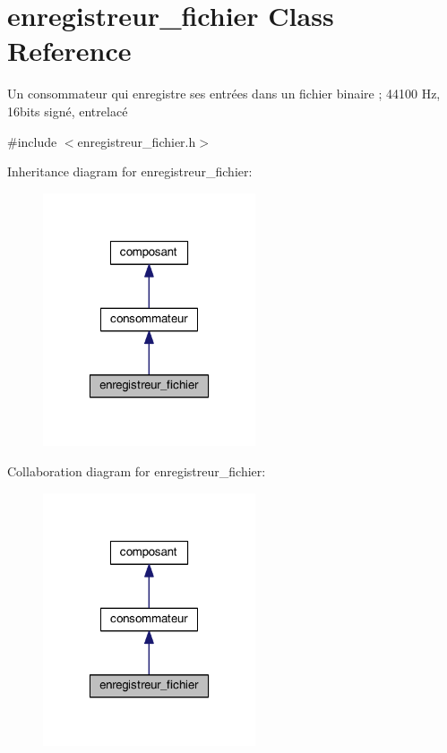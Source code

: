 \hypertarget{classenregistreur__fichier}{\section{enregistreur\-\_\-fichier Class Reference}
\label{classenregistreur__fichier}
}


Un consommateur qui enregistre ses entrées dans un fichier binaire ; 44100 Hz, 16bits signé, entrelacé  




{\ttfamily \#include $<$enregistreur\-\_\-fichier.\-h$>$}



Inheritance diagram for enregistreur\-\_\-fichier\-:
\nopagebreak
\begin{figure}[H]
\begin{center}
\leavevmode
\includegraphics[width=178pt]{classenregistreur__fichier__inherit__graph}
\end{center}
\end{figure}


Collaboration diagram for enregistreur\-\_\-fichier\-:
\nopagebreak
\begin{figure}[H]
\begin{center}
\leavevmode
\includegraphics[width=178pt]{classenregistreur__fichier__coll__graph}
\end{center}
\end{figure}
